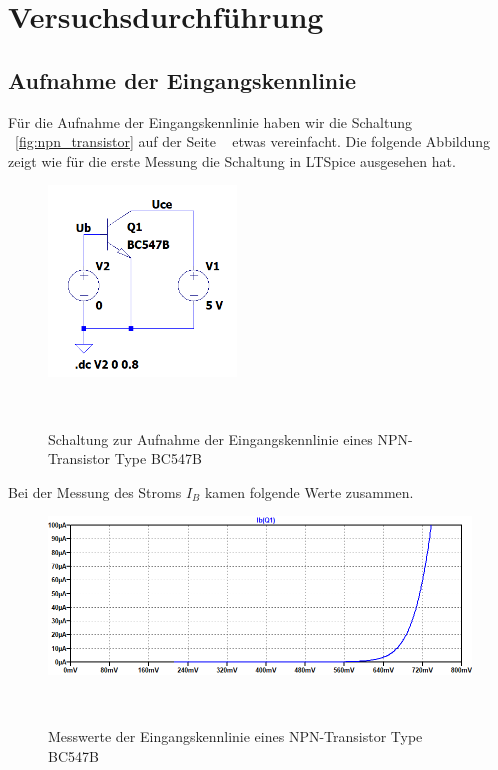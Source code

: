 \chapter{Versuchsdurchführung}
    \section{Aufnahme der Eingangskennlinie}
        Für die Aufnahme der Eingangskennlinie haben wir die Schaltung ~\ref{fig:npn_transistor} auf der Seite ~\pageref{fig:npn_transistor} etwas vereinfacht. Die folgende Abbildung zeigt wie für die erste Messung die Schaltung in LTSpice ausgesehen hat. 

        \begin{figure}[h!]
            \centering
           \includegraphics[width=5cm]{Bilder/eingangskennlinieSchaltung.png}
           \caption{Schaltung zur Aufnahme der Eingangskennlinie eines NPN-Transistor Type BC547B}
           ~\label{fig:eingangskennlinieSchaltung}
        \end{figure}
        
        Bei der Messung des Stroms \(I_B\) kamen folgende Werte zusammen. 

        \begin{figure}[h!]
            \centering
           \includegraphics[width=15cm]{Bilder/eingangskennlinie.png}
           \caption{Messwerte der Eingangskennlinie eines NPN-Transistor Type BC547B}
           ~\label{fig:eingangskennlinie}
        \end{figure}